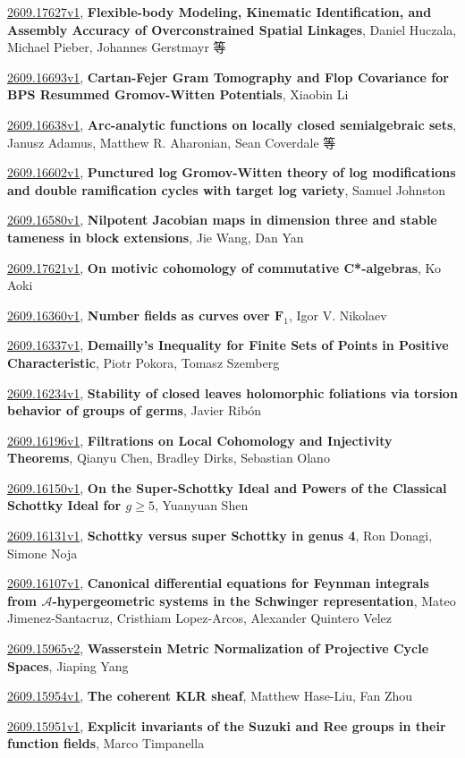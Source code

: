 \documentclass[9pt, a4paper]{article}
\theoremstyle{plain}
\theoremstyle{definition}
\theoremstyle{remark}
\newcommand{\arxiv}[3]{\href{https://arxiv.org/abs/#1}{#1}, \textbf{\textcolor{arxivblue}{#2}}, #3}
\begin{document}
\arxiv{2609.17627v1}{Flexible-body Modeling, Kinematic Identification, and Assembly Accuracy of Overconstrained Spatial Linkages}{Daniel Huczala, Michael Pieber, Johannes Gerstmayr 等}

\arxiv{2609.16693v1}{Cartan-Fejer Gram Tomography and Flop Covariance for BPS Resummed Gromov-Witten Potentials}{Xiaobin Li}

\arxiv{2609.16638v1}{Arc-analytic functions on locally closed semialgebraic sets}{Janusz Adamus, Matthew R. Aharonian, Sean Coverdale 等}

\arxiv{2609.16602v1}{Punctured log Gromov-Witten theory of log modifications and double ramification cycles with target log variety}{Samuel Johnston}

\arxiv{2609.16580v1}{Nilpotent Jacobian maps in dimension three and stable tameness in block extensions}{Jie Wang, Dan Yan}

\arxiv{2609.17621v1}{On motivic cohomology of commutative C*-algebras}{Ko Aoki}

\arxiv{2609.16360v1}{Number fields as curves over $\mathbf{F}_1$}{Igor V. Nikolaev}

\arxiv{2609.16337v1}{Demailly's Inequality for Finite Sets of Points in Positive Characteristic}{Piotr Pokora, Tomasz Szemberg}

\arxiv{2609.16234v1}{Stability of closed leaves holomorphic foliations via torsion behavior of groups of germs}{Javier Ribón}

\arxiv{2609.16196v1}{Filtrations on Local Cohomology and Injectivity Theorems}{Qianyu Chen, Bradley Dirks, Sebastian Olano}

\arxiv{2609.16150v1}{On the Super-Schottky Ideal and Powers of the Classical Schottky Ideal for $g \geq 5$}{Yuanyuan Shen}

\arxiv{2609.16131v1}{Schottky versus super Schottky in genus 4}{Ron Donagi, Simone Noja}

\arxiv{2609.16107v1}{Canonical differential equations for Feynman integrals from $\mathcal{A}$-hypergeometric systems in the Schwinger representation}{Mateo Jimenez-Santacruz, Cristhiam Lopez-Arcos, Alexander Quintero Velez}

\arxiv{2609.15965v2}{Wasserstein Metric Normalization of Projective Cycle Spaces}{Jiaping Yang}

\arxiv{2609.15954v1}{The coherent KLR sheaf}{Matthew Hase-Liu, Fan Zhou}

\arxiv{2609.15951v1}{Explicit invariants of the Suzuki and Ree groups in their function fields}{Marco Timpanella}
\end{document}
